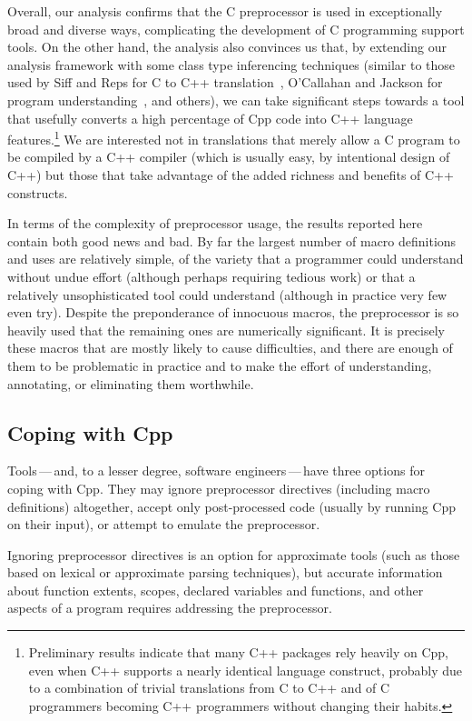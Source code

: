 \documentclass[10pt]{article}
\begin{document}
Overall, our analysis confirms that the C preprocessor is used in
exceptionally broad and diverse ways, complicating the development of C
programming support tools.  On the other hand, the analysis also convinces
us that, by extending our analysis framework with some class type
inferencing techniques (similar to those used by Siff and Reps for C to C++
translation~\cite{Siff-fse96}, O'Callahan and Jackson for program
understanding~\cite{OCallahan-icse97}, and others), we can take significant
steps towards a tool that usefully converts a high percentage of Cpp code
into C++ language features.\footnote{Preliminary results indicate that many
  C++ packages rely heavily on Cpp, even when C++ supports a nearly
  identical language construct, probably due to a combination of trivial
  translations from C to C++ and of C programmers becoming C++ programmers
  without changing their habits.} We are interested not in translations
that merely allow a C program to be compiled by a C++ compiler (which is
usually easy, by intentional design of C++) but those that take advantage
of the added richness and benefits of C++ constructs.

In terms of the complexity of preprocessor usage, the results reported here
contain both good news and bad.  By far
the largest number of macro definitions and uses are relatively simple, of
the variety that a programmer could understand without undue effort (although
perhaps requiring tedious work) or that a relatively unsophisticated tool
could understand (although in practice very few even try).  Despite the
preponderance of innocuous macros, the preprocessor is so heavily used that
the remaining ones are numerically significant.  It is precisely these
macros that are mostly likely to cause difficulties, and there are enough
of them to be problematic in practice and to make the effort of
understanding, annotating, or eliminating them worthwhile.


\subsection{Coping with Cpp}

Tools\,---\,and, to a lesser degree, software engineers\,---\,have three
options for coping with Cpp.    They may ignore preprocessor directives
(including macro definitions) altogether, accept only post-processed code
(usually by running Cpp on their input), or attempt to emulate the
preprocessor.

Ignoring preprocessor directives is an option for approximate tools (such
as those based on lexical or approximate parsing techniques), but accurate
information about function extents, scopes, declared variables and
functions, and other aspects of a program requires addressing the
preprocessor.
\end{document}
